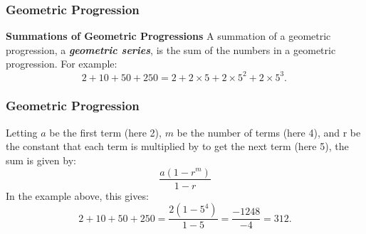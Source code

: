 \documentclass{beamer}
\begin{document}
\begin{frame}
	\frametitle{Geometric Progression}
\textbf{Summations of Geometric Progressions}
A summation of a geometric progression, a \textit{\textbf{geometric series}}, is the sum of the numbers in a geometric progression. For example:
\[2+10+50+250=2+2\times 5+2\times 5^{2}+2\times 5^{3}.\,\]
\end{frame}

\begin{frame}
	\frametitle{Geometric Progression}
Letting $a$ be the first term (here 2), $m$ be the number of terms (here 4), and r be the constant that each term is multiplied by to get the next term (here 5), the sum is given by:
\[{\frac  {a(1-r^{m})}{1-r}}\]
In the example above, this gives:
\[2+10+50+250={\frac  {2(1-5^{4})}{1-5}}={\frac  {-1248}{-4}}=312.\]
\end{frame}
\end{document}
